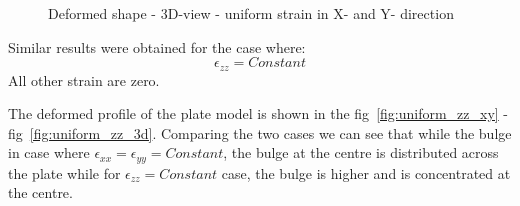 \begin{figure}[!htbp]
\begin{minipage}{0.3\textwidth}
    \caption{Deformed shape - 3D-view - uniform strain in X- and Y- direction}
    \label{fig:uniform_xxyy_3d}
\end{minipage}
\end{figure}

Similar results were obtained for the case where:
\begin{equation}
    \epsilon_{zz} = Constant
\end{equation}
All other strain are zero. 

The deformed profile of the plate model is shown in the fig~\ref{fig:uniform_zz_xy} - fig~\ref{fig:uniform_zz_3d}. Comparing the two cases we can see that while the bulge in case where $\epsilon_{xx} = \epsilon_{yy} = Constant$, the bulge at the centre is distributed across the plate while for $\epsilon_{zz} = Constant$ case, the bulge is higher and is concentrated at the centre.

